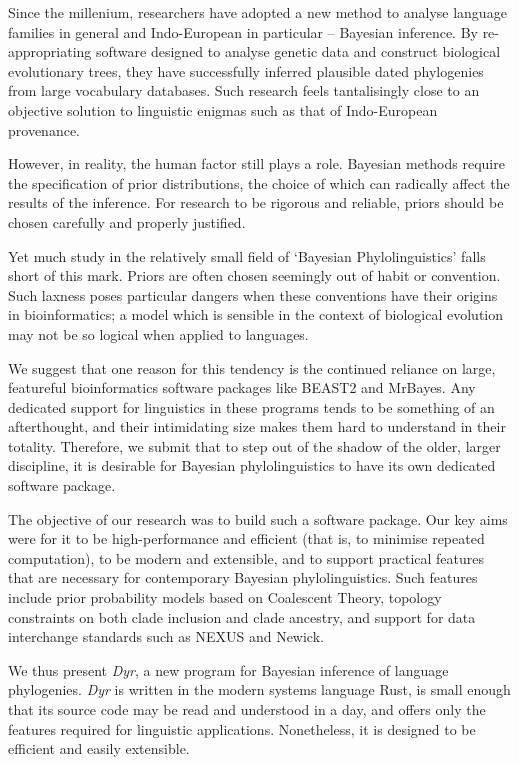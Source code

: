 \documentclass[10pt,journal,compsoc]{IEEEtran}
\begin{document}
Since the millenium, researchers have adopted a new method to analyse language families in general and Indo-European in particular -- Bayesian inference. By re-appropriating software designed to analyse genetic data and construct biological evolutionary trees, they have successfully inferred plausible dated phylogenies from large vocabulary databases. Such research feels tantalisingly close to an objective solution to linguistic enigmas such as that of Indo-European provenance.

However, in reality, the human factor still plays a role. Bayesian methods require the specification of prior distributions, the choice of which can radically affect the results of the inference. For research to be rigorous and reliable, priors should be chosen carefully and properly justified.

Yet much study in the relatively small field of `Bayesian Phylolinguistics' falls short of this mark. Priors are often chosen seemingly out of habit or convention. Such laxness poses particular dangers when these conventions have their origins in bioinformatics; a model which is sensible in the context of biological evolution may not be so logical when applied to languages.

We suggest that one reason for this tendency is the continued reliance on large, featureful bioinformatics software packages like BEAST2 and MrBayes. Any dedicated support for linguistics in these programs tends to be something of an afterthought, and their intimidating size makes them hard to understand in their totality. Therefore, we submit that to step out of the shadow of the older, larger discipline, it is desirable for Bayesian phylolinguistics to have its own dedicated software package.

The objective of our research was to build such a software package. Our key aims were for it to be high-performance and efficient (that is, to minimise repeated computation), to be modern and extensible, and to support practical features that are necessary for contemporary Bayesian phylolinguistics. Such features include prior probability models based on Coalescent Theory, topology constraints on both clade inclusion and clade ancestry, and support for data interchange standards such as NEXUS and Newick.

We thus present \textit{Dyr}, a new program for Bayesian inference of language phylogenies. \textit{Dyr} is written in the modern systems language Rust, is small enough that its source code may be read and understood in a day, and offers only the features required for linguistic applications. Nonetheless, it is designed to be efficient and easily extensible. 
\end{document}
